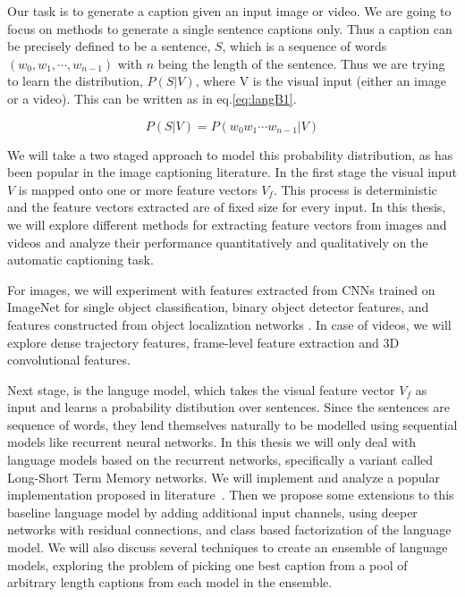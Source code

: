 Our task is to generate a caption given an input image or video. 
We are going to focus on methods to generate a single sentence captions only. 
Thus a caption can be precisely defined to be a sentence, $S$, which is a
sequence of words $(w_0, w_1,\cdots, w_{n-1})$ with $n$ being the length of the
sentence. 
Thus we are trying to learn the distribution, $P(S|V)$, where V is the visual
input (either an image or a video). 
This can be written as in eq.\ref{eq:langB1}. 

\begin{equation}
\label{eq:langB1} P(S|V) = P(w_0 w_1 \cdots w_{n-1}|V)
\end{equation}

We will take a two staged approach to model this probability distribution, as
has been popular in the image captioning literature. 
In the first stage the visual input $V$ is mapped onto one or more feature
vectors $V_f$.
This process is deterministic and the feature vectors extracted are of fixed
size for every input. 
In this thesis, we will explore different methods for extracting feature
vectors from images and videos and analyze their performance quantitatively and
qualitatively on the automatic captioning task. 

For images, we will experiment with features extracted from CNNs trained on
ImageNet for single object classification, binary object detector features, and
features constructed from object localization networks .
In case of videos, we will explore dense trajectory features, frame-level
feature extraction and 3D convolutional features. 

Next stage, is the languge model, which takes the visual feature vector $V_f$ as
input and learns a probability distibution over sentences.
Since the sentences are sequence of words, they lend themselves naturally to be
modelled using sequential models like recurrent neural networks.
In this thesis we will only deal with language models based on the recurrent
networks, specifically a variant called Long-Short Term Memory networks.
We will implement and analyze a popular implementation proposed in
literature~\cite{Vinyals_2015_CVPR}.
Then we propose some extensions to this baseline language model by adding
additional input channels, using deeper networks with residual connections,
and class based factorization of the language model. 
We will also discuss several techniques to create an ensemble of language
models, exploring the problem of picking one best caption from a
pool of arbitrary length captions from each model in the ensemble.

